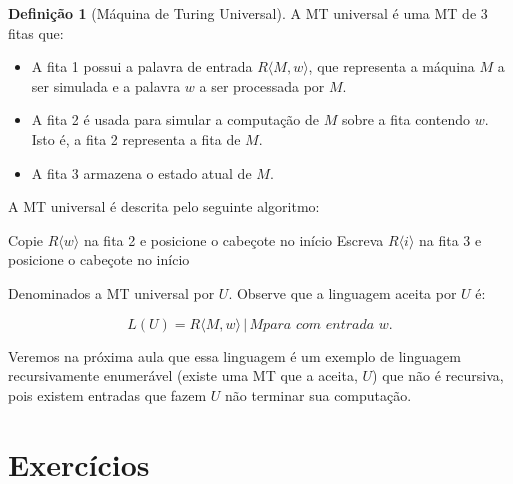 \documentclass[a4paper]{article}
\theoremstyle{definition}
\newtheorem{Definition}{Definição}
\begin{document}
  \begin{Definition}[Máquina de Turing Universal]
    A MT universal é uma MT de 3 fitas que:
    \begin{itemize}
      \item A fita 1 possui a palavra de entrada $R\langle M,w \rangle$, que
        representa a máquina $M$ a ser simulada e a palavra $w$ a ser processada
        por $M$.
      \item A fita 2 é usada para simular a computação de $M$ sobre a fita
        contendo $w$. Isto é, a fita 2 representa a fita de $M$.
      \item A fita 3 armazena o estado atual de $M$.
      \end{itemize}
      A MT universal é descrita pelo seguinte algoritmo:

      
      \begin{algorithm}[H]
        Copie $R\langle w \rangle$ na fita 2 e posicione o cabeçote no início \;
        Escreva $R\langle i \rangle$ na fita 3 e posicione o cabeçote no início\;
      \end{algorithm}
  \end{Definition}

  Denominados a MT universal por $U$. Observe que a linguagem aceita por $U$ é:

  \[
    L(U) = {R\langle M,w \rangle \,|\, M \textit{para com entrada }w}.
  \]

  Veremos na próxima aula que essa linguagem é um exemplo de linguagem
  recursivamente enumerável (existe uma MT que a aceita, $U$) que não é
  recursiva, pois existem entradas que fazem $U$ não terminar sua computação.
  
  \section{Exercícios}
\end{document}
